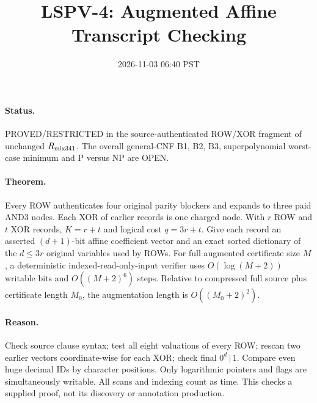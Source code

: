 \documentclass{article}
\title{LSPV-4: Augmented Affine Transcript Checking}
\date{2026-11-03 06:40 PST}
\begin{document}
\maketitle
\paragraph{Status.} PROVED/RESTRICTED in the source-authenticated ROW/XOR fragment of unchanged $R_{\rm mix341}$. The overall general-CNF B1, B2, B3, superpolynomial worst-case minimum and P versus NP are OPEN.
\paragraph{Theorem.} Every ROW authenticates four original parity blockers and expands to three paid AND3 nodes. Each XOR of earlier records is one charged node. With $r$ ROW and $t$ XOR records, $K=r+t$ and logical cost $q=3r+t$. Give each record an asserted $(d+1)$-bit affine coefficient vector and an exact sorted dictionary of the $d\le3r$ original variables used by ROWs. For full augmented certificate size $M$, a deterministic indexed-read-only-input verifier uses $O(\log(M+2))$ writable bits and $O((M+2)^6)$ steps. Relative to compressed full source plus certificate length $M_0$, the augmentation length is $O((M_0+2)^2)$.
\paragraph{Reason.} Check source clause syntax; test all eight valuations of every ROW; rescan two earlier vectors coordinate-wise for each XOR; check final $0^d\,|\,1$. Compare even huge decimal IDs by character positions. Only logarithmic pointers and flags are simultaneously writable. All scans and indexing count as time. This checks a supplied proof, not its discovery or annotation production.
\end{document}
